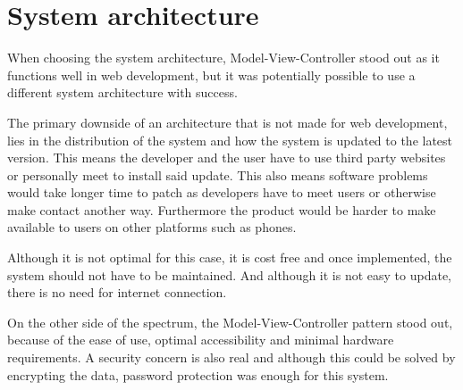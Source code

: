 \section{System architecture}	
When choosing the system architecture, Model-View-Controller stood out as it functions well in web development, but it was potentially possible to use a different system architecture with success.

The primary downside of an architecture that is not made for web development, lies in the distribution of the system and how the system is updated to the latest version.
This means the developer and the user have to use third party websites or personally meet to install said update.	
This also means software problems would take longer time to patch as developers have to meet users or otherwise make contact another way.	
Furthermore the product would be harder to make available to users on other platforms such as phones.	

Although it is not optimal for this case, it is cost free and once implemented, the system should not have to be maintained.	
And although it is not easy to update, there is no need for internet connection.	

On the other side of the spectrum, the Model-View-Controller pattern stood out, because of the ease of use, optimal accessibility and minimal hardware requirements.
A security concern is also real and although this could be solved by encrypting the data, password protection was enough for this system.